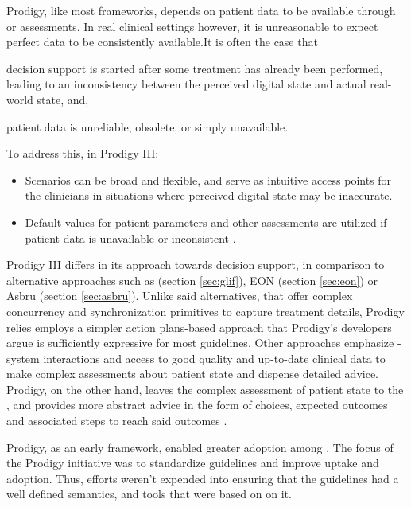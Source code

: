 Prodigy, like most \CDSSs{} frameworks, depends on patient data to
be available through \EHRs{} or \HCP{} assessments. In real clinical settings
however, it is unreasonable to expect perfect data to be consistently
available.It is often the case that
\begin{enumerate*}[label=(\alph*)]
  \item decision support is started after some treatment has already
    been performed, leading to an inconsistency between the perceived
    digital state and actual real-world state, and,
  \item patient data is unreliable, obsolete, or simply unavailable.
\end{enumerate*}
To address this, in Prodigy III:
\begin{itemize}
  \item Scenarios can be broad and flexible, and serve as intuitive access points for
    the clinicians in situations where perceived digital state may be
    inaccurate.
  \item Default values for patient parameters and other assessments are utilized
    if patient data is unavailable or inconsistent \cite{JohnsonAMIA00}.
\end{itemize}

Prodigy III differs in its approach towards decision support, in comparison
to alternative approaches such as \GLIF{} (section \ref{sec:glif}), EON (section
\ref{sec:eon}) or Asbru (section \ref{sec:asbru}). Unlike said alternatives,
that offer complex concurrency and synchronization primitives to capture
treatment details, Prodigy relies employs a simpler action plans-based approach
that Prodigy's developers argue is sufficiently expressive for most guidelines.
Other approaches emphasize \HCP{}-system interactions and access to good quality
and up-to-date clinical data to make complex assessments about patient state and dispense detailed
advice. Prodigy, on the other hand, leaves the complex assessment of patient
state to the \HCP{}, and provides more abstract advice in the form of choices,
expected outcomes and associated steps to reach said outcomes \cite{JohnsonAMIA00}.

Prodigy, as an early \CDSS{} framework, enabled greater adoption among
\HCPs{}. The focus of the Prodigy initiative was to standardize guidelines and
improve uptake and adoption. Thus, efforts weren't expended into ensuring that
the guidelines had a well defined semantics, and tools that were based on
on it.

\subsection{\SAGE{}}\label{sec:sage}

